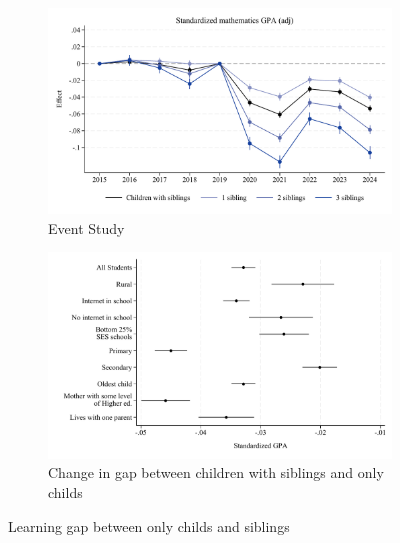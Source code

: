 \begin{figure}[htbp]
    \centering
    
    \begin{subfigure}{\textwidth}
        \centering
        \includegraphics[width=\textwidth]{./FIGURES/Event Study/covid_std_gpa_m_adj_all_all_all_elm_all.pdf}
        \caption{Event Study}
        \label{fig:fig2a}
    \end{subfigure}
    
    \vspace{1em} %
    
    \begin{subfigure}{\textwidth}
        \centering
        \includegraphics[width=\textwidth]{./FIGURES/TWFE/covid_twfe_summ_all_20-21_gpa_m_adj_Tsiblings_Soldest_4.pdf}
        \caption{Change in gap between children with siblings and only childs}
        \label{fig:fig2b}
    \end{subfigure}
    
    \caption{Learning gap between only childs and siblings}
    \label{fig:fig2}
\end{figure}


\clearpage
















